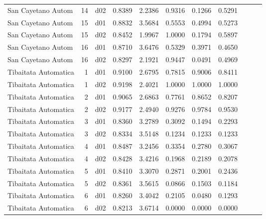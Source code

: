 \begin{landscape}
\begin{longtable}{p{2cm}rrrrrrrrrr}
     San Cayetano Autom   &         14 &     d02 &   0.8389 &  2.2386 &        0.9316 &           0.1266 &  0.5291 \\
     San Cayetano Autom   &         15 &     d01 &   0.8832 &  3.5684 &        0.5553 &           0.4994 &  0.5273 \\
     San Cayetano Autom   &         15 &     d02 &   0.8452 &  1.9967 &        1.0000 &           0.1794 &  0.5897 \\
     San Cayetano Autom   &         16 &     d01 &   0.8710 &  3.6476 &        0.5329 &           0.3971 &  0.4650 \\
     San Cayetano Autom   &         16 &     d02 &   0.8297 &  2.1921 &        0.9447 &           0.0491 &  0.4969 \\
    Tibaitata Automatica  &          1 &     d01 &   0.9100 &  2.6795 &        0.7815 &           0.9006 &  0.8411 \\
    Tibaitata Automatica  &          1 &     d02 &   0.9198 &  2.4021 &        1.0000 &           1.0000 &  1.0000 \\
    Tibaitata Automatica  &          2 &     d01 &   0.9065 &  2.6863 &        0.7761 &           0.8652 &  0.8207 \\
    Tibaitata Automatica  &          2 &     d02 &   0.9177 &  2.4940 &        0.9276 &           0.9784 &  0.9530 \\
    Tibaitata Automatica  &          3 &     d01 &   0.8360 &  3.2789 &        0.3092 &           0.1494 &  0.2293 \\
    Tibaitata Automatica  &          3 &     d02 &   0.8334 &  3.5148 &        0.1234 &           0.1233 &  0.1233 \\
    Tibaitata Automatica  &          4 &     d01 &   0.8487 &  3.2456 &        0.3354 &           0.2780 &  0.3067 \\
    Tibaitata Automatica  &          4 &     d02 &   0.8428 &  3.4216 &        0.1968 &           0.2189 &  0.2078 \\
    Tibaitata Automatica  &          5 &     d01 &   0.8410 &  3.3070 &        0.2871 &           0.2001 &  0.2436 \\
    Tibaitata Automatica  &          5 &     d02 &   0.8361 &  3.5615 &        0.0866 &           0.1503 &  0.1184 \\
    Tibaitata Automatica  &          6 &     d01 &   0.8260 &  3.4042 &        0.2105 &           0.0480 &  0.1293 \\
    Tibaitata Automatica  &          6 &     d02 &   0.8213 &  3.6714 &        0.0000 &           0.0000 &  0.0000 \\

\end{longtable}
\end{landscape}
